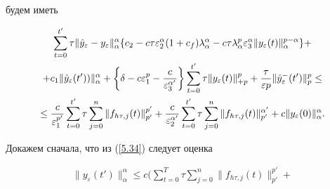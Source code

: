 \begin{pf}
будем иметь


\begin{gather}


\sum^{t'}_{t=0}


\tau \| \Hat{y}_\varepsilon - y_\varepsilon \|^{\alpha}_{\alpha }


\{ c_2 - c\tau


\varepsilon^{\alpha}_{2}


( 1 +c_f) {\lambda}^{\alpha }_{\alpha } -


c


\tau\lambda^{p}_{\alpha} \varepsilon^{\alpha}_{3}


\|  y_\varepsilon(t) \| ^{p-\alpha}_{\alpha} \} +\notag\\


%


+ c_{1}\| \Hat{y}_\varepsilon(t')) \|^{\alpha}_{\alpha} +


\left\{ \delta - c \varepsilon^{p}_{1} -


\frac{c}{\varepsilon^{\alpha '}_{3}}  \right\}


\sum^{t'}_{t=0}\tau


\|  y_\varepsilon(t) {\|}^{p}_{+p} +


\frac{\tau}{\varepsilon p}\| \Hat{y}_\varepsilon^{-}(t')


\|^p_p \le \notag \\


\le


\frac{c}{ \varepsilon_{1}^{p'} }


\sum^{t'}_{t=0}\tau \sum^{n}_{j=0}


\|  f_{h\tau,j}(t) {\|}^{p'}_{p'}


+ \frac{c}{\varepsilon^{{\alpha}'}_{2} }


\sum^{t'}_{t=0}\tau\sum^{n}_{j=0}\| f_{h\tau,j}(t)


\| ^{\alpha '}_{p'} +


c \| y_\varepsilon(0) \|^{\alpha}_{\alpha}.


\label{5.34}


\end{gather}


Докажем сначала, что из (\ref{5.34}) следует оценка


\begin{gather}


\|  y_\varepsilon(t') { \| }^{\alpha }_{\alpha } \le


c \biggl( \sum^{T}_{t=0}\tau \sum^{n}_{j=0}


\|  f_{h\tau,j}(t) {\| }^{p'}_{p'} +



\end{gather}
\end{pf}
